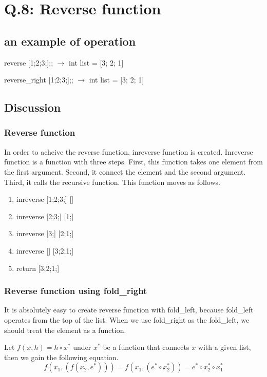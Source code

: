 \documentclass[uplatex,12pt]{jsarticle}
\begin{document}
\section {Q.8: Reverse function}

\subsection{an example of operation}

reverse [1;2;3;];; $\rightarrow$ int list = [3; 2; 1]

reverse\_right [1;2;3;];; $\rightarrow$ int list = [3; 2; 1]

\subsection{Discussion}

\subsubsection{Reverse function}
In order to acheive the reverse function, inreverse function is created. Inreverse function is a function with three steps. First, this function takes one element from the first argument. Second, it connect the element and the second argument. Third, it calls the recursive function.
This function moves as follows.
\begin{enumerate}
  \item inreverse [1;2;3;] []
  \item inreverse [2;3;] [1;]
  \item inreverse [3;] [2;1;]
  \item inreverse [] [3;2;1;]
  \item return [3;2;1;]
\end{enumerate}

\subsubsection{Reverse function using fold\_right}
It is absolutely easy to create reverse function with fold\_left, because fold\_left operates from the top of the list. When we use fold\_right as the fold\_left, we should treat the element as a function.

Let $f (x, h) = h \circ x^*$ under $x^*$ be a function that connects $x$ with a given list, then we gain the following equation.
$$f (x_1,(f (x_2,e^*))) = f (x_1, (e^* \circ x_2^*)) = e^* \circ x_2^* \circ x_1^*$$
\end{document}
